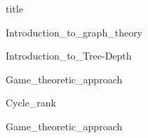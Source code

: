 \documentclass[a4paper,12pt]{report}
\begin{document}
{title}
	
{Introduction_to_graph_theory}

{Introduction_to_Tree-Depth}

{Game_theoretic_approach}

{Cycle_rank}

{Game_theoretic_approach}
\end{document}
